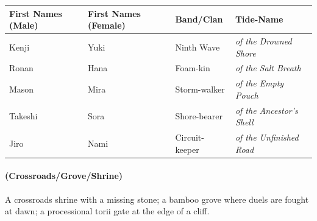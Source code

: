 \begin{longtable}{|p{}|p{}|p{}|p{}|}
\hline
\textbf{First Names (Male)} & \textbf{First Names (Female)} & \textbf{Band/Clan} & \textbf{Tide-Name} \\
\hline
Kenji & Yuki & Ninth Wave & \textit{of the Drowned Shore} \\
\hline
Ronan & Hana & Foam-kin & \textit{of the Salt Breath} \\
\hline
Mason & Mira & Storm-walker & \textit{of the Empty Pouch} \\
\hline
Takeshi & Sora & Shore-bearer & \textit{of the Ancestor's Shell} \\
\hline
Jiro & Nami & Circuit-keeper & \textit{of the Unfinished Road} \\
\hline
\end{longtable}

\paragraph*{(Crossroads/Grove/Shrine)} A crossroads shrine with a missing stone; a bamboo grove where duels are fought at dawn; a processional torii gate at the edge of a cliff.

